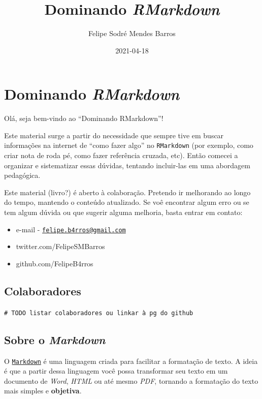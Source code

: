 \documentclass[]{book}
\title{Dominando \emph{RMarkdown}}
\author{Felipe Sodré Mendes Barros}
\date{2021-04-18}
\providecommand{\tightlist}{%
  \setlength{\itemsep}{0pt}\setlength{\parskip}{0pt}}
\begin{document}
\maketitle

{
\setcounter{tocdepth}{1}
\tableofcontents
}
\hypertarget{intro}{%
\chapter{\texorpdfstring{Dominando \emph{RMarkdown}}{Dominando RMarkdown}}\label{intro}}

Olá, seja bem-vindo ao ``Dominando RMarkdown''!

Este material surge a partir do necessidade que sempre tive em buscar informações na internet de ``como fazer algo'' no \texttt{RMarkdown} (por exemplo, como criar nota de roda pé, como fazer referência cruzada, etc). Então comecei a organizar e sistematizar essas dúvidas, tentando incluir-las em uma abordagem pedagógica.

Este material (livro?) é aberto à colaboração. Pretendo ir melhorando ao longo do tempo, mantendo o conteúdo atualizado. Se voê encontrar algum erro ou se tem algum dúvida ou que sugerir alguma melhoria, basta entrar em contato:

\begin{itemize}
\tightlist
\item
  e-mail - \href{mailto:felipe.b4rros@gmail.com}{\nolinkurl{felipe.b4rros@gmail.com}}
\item
  twitter.com/FelipeSMBarros
\item
  github.com/FelipeB4rros
\end{itemize}

\hypertarget{colaboradores}{%
\section{Colaboradores}\label{colaboradores}}

\texttt{\#\ TODO\ listar\ colaboradores\ ou\ linkar\ à\ pg\ do\ github}

\hypertarget{markdown}{%
\section{\texorpdfstring{Sobre o \emph{Markdown}}{Sobre o Markdown}}\label{markdown}}

O \href{https://pt.wikipedia.org/wiki/Markdown}{\texttt{Markdown}} é uma linguagem criada para facilitar a formatação de texto. A ideia é que a partir dessa linguagem você possa transformar seu texto em um documento de \emph{Word}, \emph{HTML} ou até mesmo \emph{PDF}, tornando a formatação do texto mais simples e \textbf{objetiva}.
\end{document}
